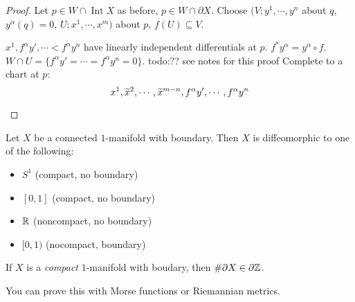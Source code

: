 \begin{proof}
    Let $p \in W \cap  \operatorname{Int}X$ as before, $p \in W \cap \partial X$. Choose $(V; y^1,\cdots ,y^n $ about $q$, $y^{\alpha }(q)=0$, $U;x^1,\cdots ,x^m)$ about $p$, $f(U) \subseteq V$.
    \begin{claim}
        $x^1,f^{\alpha }y',\cdots <f^{\alpha }y^n $ have linearly independent differentials at $p$. $f^* y^{\alpha }=y^{\alpha }\circ f$. $W \cap U=\{f^{\alpha }y'= \cdots =f^{\alpha }y^n =0\} $. {\color{red}todo:?? see notes for this proof} Complete to a chart at $p:$ \[
        x^1, \widetilde x^2,\cdots , \widetilde x^{m-n}, f^{\alpha }y',\cdots ,f^{\alpha }y^n \qedhere
        \] 
    \end{claim}
\end{proof}
\begin{theorem}
    Let $X$ be a connected $1$-manifold with boundary. Then $X$ is diffeomorphic to one of the following:
    \begin{itemize}
        \setlength\itemsep{-.2em}
    \item $S^1 $ (compact, no boundary)
    \item $[0,1]$ (compact, no boundary)
    \item $\mathbb{R}$ (noncompact, no boundary)
    \item $[0,1)$ (nocompact, boundary)
    \end{itemize}
\end{theorem}
\begin{cor}
    If $X$ is a \emph{compact} $1$-manifold with boudary, then $\# \partial X \in  \partial \mathbb{Z}$.
\end{cor}
You can prove this with Morse functions or Riemannian metrics.
